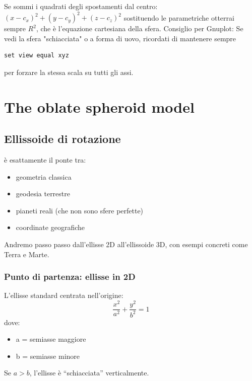 \documentclass[a4paper,14pt]{article}
\begin{document}
Se sommi i quadrati degli spostamenti dal centro:\((x-c_{x})^{2}+(y-c_{y})^{2}+(z-c_{z})^{2}\)
sostituendo le parametriche otterrai sempre \(R^{2}\), che è l'equazione cartesiana della sfera.
Consiglio per Gnuplot: Se vedi la sfera "schiacciata" o a forma di uovo, ricordati di mantenere sempre
\begin{verbatim}
set view equal xyz
\end{verbatim}
per forzare la stessa scala su tutti gli assi.
\section{The oblate spheroid model}
\subsection{Ellissoide di rotazione}
è esattamente il ponte tra:
\begin{itemize}
\item geometria classica
\item geodesia terrestre
\item pianeti reali (che non sono sfere perfette)
\item coordinate geografiche
\end{itemize}
Andremo passo passo dall’ellisse 2D all’ellissoide 3D, con esempi concreti come Terra e Marte.
\subsubsection{Punto di partenza: ellisse in 2D}
L’ellisse standard centrata nell’origine:
\[\frac{x^2}{a^2}+\frac{y^2}{b^2}=1\]
dove:
\begin{itemize}
\item a = semiasse maggiore
\item b = semiasse minore
\end{itemize}
Se \(a>b\), l’ellisse è “schiacciata” verticalmente.\\
\end{document}
